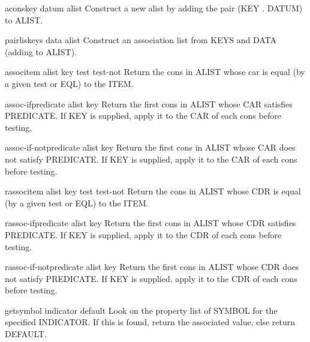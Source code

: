 \documentclass[10pt,english]{book}
\begin{document}
\begin{function}{acons}{key datum alist}
  Construct a new alist by adding the pair (KEY . DATUM) to ALIST.
\end{function}

\begin{function}{pairlis}{keys data \op alist}
  Construct an association list from KEYS and DATA (adding to ALIST).
\end{function}

\begin{function}{assoc}{item alist \key key test test-not}
  Return the cons in ALIST whose car is equal (by a given test or EQL) to
   the ITEM.
\end{function}

\begin{function}{assoc-if}{predicate alist \key key}
  Return the first cons in ALIST whose CAR satisfies PREDICATE. If
   KEY is supplied, apply it to the CAR of each cons before testing.
\end{function}

\begin{function}{assoc-if-not}{predicate alist \key key}
  Return the first cons in ALIST whose CAR does not satisfy PREDICATE.
  If KEY is supplied, apply it to the CAR of each cons before testing.
\end{function}

\begin{function}{rassoc}{item alist \key key test test-not}
  Return the cons in ALIST whose CDR is equal (by a given test or EQL) to
   the ITEM.
\end{function}

\begin{function}{rassoc-if}{predicate alist \key key}
  Return the first cons in ALIST whose CDR satisfies PREDICATE. If KEY
  is supplied, apply it to the CDR of each cons before testing.
\end{function}

\begin{function}{rassoc-if-not}{predicate alist \key key}
  Return the first cons in ALIST whose CDR does not satisfy PREDICATE.
  If KEY is supplied, apply it to the CDR of each cons before testing.
\end{function}

\begin{accessor}{get}{symbol indicator \op default}
  Look on the property list of SYMBOL for the specified INDICATOR. If this
  is found, return the associated value, else return DEFAULT.
\end{accessor}
\end{document}
